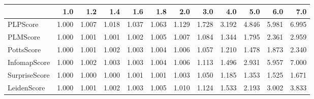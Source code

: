 \begin{tabular}{lrrrrrrrrrrr}
\toprule
{} &   1.0 &   1.2 &   1.4 &   1.6 &   1.8 &   2.0 &   3.0 &   4.0 &   5.0 &   6.0 &   7.0 \\
\midrule
PLPScore      & 1.000 & 1.007 & 1.018 & 1.037 & 1.063 & 1.129 & 1.728 & 3.192 & 4.846 & 5.981 & 6.995 \\
PLMScore      & 1.000 & 1.001 & 1.001 & 1.002 & 1.005 & 1.007 & 1.084 & 1.344 & 1.795 & 2.361 & 2.959 \\
PottsScore    & 1.000 & 1.001 & 1.002 & 1.003 & 1.004 & 1.006 & 1.057 & 1.210 & 1.478 & 1.873 & 2.340 \\
InfomapScore  & 1.000 & 1.002 & 1.003 & 1.003 & 1.004 & 1.006 & 1.113 & 1.496 & 2.931 & 5.957 & 7.000 \\
SurpriseScore & 1.000 & 1.000 & 1.000 & 1.001 & 1.001 & 1.003 & 1.050 & 1.185 & 1.353 & 1.525 & 1.671 \\
LeidenScore   & 1.000 & 1.001 & 1.002 & 1.003 & 1.005 & 1.010 & 1.124 & 1.533 & 2.193 & 3.002 & 3.833 \\
\bottomrule
\end{tabular}
